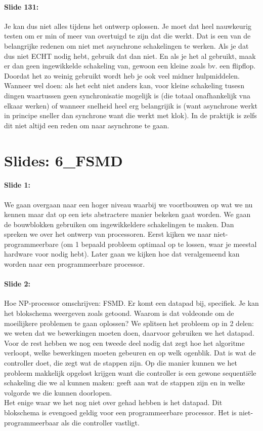 \documentclass[10pt,a4paper]{book}
\begin{document}
\paragraph{Slide 131:} Je kan dus niet alles tijdens het ontwerp oplossen. Je moet dat heel nauwkeurig testen om er min of meer van overtuigd te zijn dat die werkt. Dat is een van de belangrijke redenen om niet met asynchrone schakelingen te werken. Als je dat dus niet ECHT nodig hebt, gebruik dat dan niet. En als je het al gebruikt, maak er dan geen ingewikkelde schakeling van, gewoon een kleine zoals bv. een flipflop.\\
Doordat het zo weinig gebruikt wordt heb je ook veel midner hulpmiddelen.\\
Wanneer wel doen: als het echt niet anders kan, voor kleine schakeling tusesn dingen waartussen geen synchronisatie mogelijk is (die totaal onafhankelijk vna elkaar werken) of wanneer snelheid heel erg belangrijik is (want asynchrone werkt in principe sneller dan synchrone want die werkt met klok). In de praktijk is zelfs dit niet altijd een reden om naar asynchrone te gaan. 

\section{Slides: 6\_FSMD}

\paragraph{Slide 1:} We gaan overgaan naar een hoger niveau waarbij we voortbouwen op wat we nu kennen maar dat op een iets abstractere manier bekeken gaat worden. We gaan de bouwblokken gebruiken om ingewikkeldere schakelingen te maken. Dan spreken we over het ontwerp van processoren. Eerst kijken we naar niet-programmeerbare (om 1 bepaald probleem optimaal op te lossen, waar je meestal hardware voor nodig hebt). Later gaan we kijken hoe dat veralgemeend kan worden naar een programmeerbare processor.

\paragraph{Slide 2:} Hoe NP-processor omschrijven: FSMD. Er komt een datapad bij, specifiek. Je kan het blokschema weergeven zoals getoond. Waarom is dat voldeonde om de moeilijkere problemen te gaan oplossen? We splitsen het probleem op in 2 delen: we weten dat we bewerkingen moeten doen, daarvoor gebruiken we het datapad. Voor de rest hebben we nog een tweede deel nodig dat zegt hoe het algoritme verloopt, welke bewerkingen moeten gebeuren en op welk ogenblik. Dat is wat de controller doet, die zegt wat de stappen zijn. Op die manier kunnen we het probleem makkelijk opgelost krijgen want die controller is een gewone sequenti\"ele schakeling die we al kunnen maken: geeft aan wat de stappen zijn en in welke volgorde we die kunnen doorlopen.\\
Het enige waar we het nog niet over gehad hebben is het datapad. Dit blokschema is evengoed geldig voor een programmeerbare processor. Het is niet-programmeerbaar als die controller vastligt.
\end{document}

